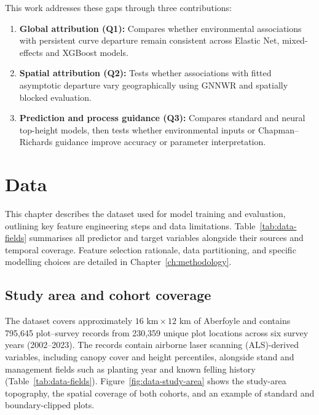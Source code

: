 \documentclass[logo,msc,ai]{infthesis}           %
\begin{document}
This work addresses these gaps through three contributions:
\begin{enumerate}
\setlength\itemsep{0pt}
\item \textbf{Global attribution (Q1):}
Compares whether environmental associations with persistent curve departure remain consistent across Elastic Net, mixed-effects and XGBoost models.
\item \textbf{Spatial attribution (Q2):}
Tests whether associations with fitted asymptotic departure vary geographically using GNNWR and spatially blocked evaluation.
\item \textbf{Prediction and process guidance (Q3):}
Compares standard and neural top-height models, then tests whether environmental inputs or Chapman--Richards guidance improve accuracy or parameter interpretation.
\end{enumerate}

\chapter{Data}
This chapter describes the dataset used for model training and evaluation, outlining key feature engineering steps and data limitations. Table~\ref{tab:data-fields} summarises all predictor and target variables alongside their sources and temporal coverage. Feature selection rationale, data partitioning, and specific modelling choices are detailed in Chapter~\ref{ch:methodology}.

\section{Study area and cohort coverage}
The dataset covers approximately $16\text{~km} \times 12\text{~km}$ of Aberfoyle and contains 795,645 plot--survey records from 230,359 unique plot locations across six survey years (2002--2023). The records contain airborne laser scanning (ALS)-derived variables, including canopy cover and height percentiles, alongside stand and management fields such as planting year and known felling history (Table~\ref{tab:data-fields}). Figure~\ref{fig:data-study-area} shows the study-area topography, the spatial coverage of both cohorts, and an example of standard and boundary-clipped plots.
\end{document}
